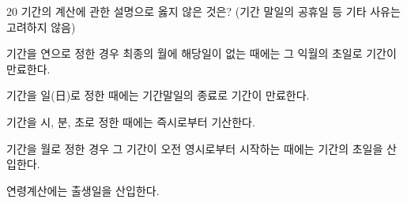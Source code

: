 \begin{question}{20}
기간의 계산에 관한 설명으로 옳지 않은 것은? (기간 말일의 공휴일 등 기타 사유는 고려하지 않음)
\begin{choices}
  \item 기간을 연으로 정한 경우 최종의 월에 해당일이 없는 때에는 그 익월의 초일로 기간이 만료한다.
  \item 기간을 일(日)로 정한 때에는 기간말일의 종료로 기간이 만료한다.
  \item 기간을 시, 분, 초로 정한 때에는 즉시로부터 기산한다.
  \item 기간을 월로 정한 경우 그 기간이 오전 영시로부터 시작하는 때에는 기간의 초일을 산입한다.
  \item 연령계산에는 출생일을 산입한다.
\end{choices}
\end{question}
